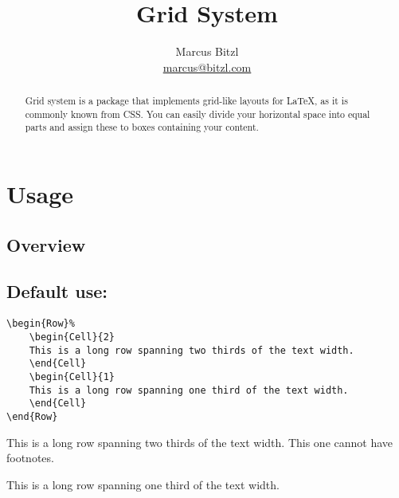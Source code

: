\documentclass[DIV13]{scrartcl}
\title{Grid System}
\author{Marcus Bitzl\\ \url{marcus@bitzl.com}}
\renewcommand{\emph}[1]{\textcolor{red!65!black}{#1}}
\begin{document}
\maketitle

\begin{abstract}
Grid system is a package that implements grid-like layouts for \LaTeX, as it is commonly known from CSS. You can easily divide your horizontal space into equal parts and assign these to boxes containing your content.
\end{abstract}

\section{Usage}
\subsection{Overview}

\medskip

\subsection{Default use:}
\begin{verbatim}
\begin{Row}%
    \begin{Cell}{2}
    This is a long row spanning two thirds of the text width.
    \end{Cell}
    \begin{Cell}{1}
    This is a long row spanning one third of the text width.
    \end{Cell}
\end{Row}
\end{verbatim}

\begin{Row}%
	\begin{Cell}{2}
	This is a long row spanning two thirds of the text width. This one cannot have footnotes.
	\end{Cell}
	\begin{Cell}{1}
	This is a long row spanning one third of the text width.
	\end{Cell}
\end{Row}
\end{document}
